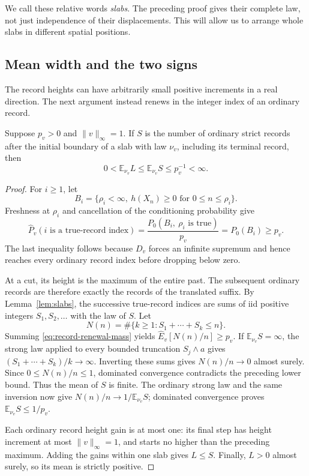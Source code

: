 We call these relative words \emph{slabs}.  The preceding proof gives
their complete law, not just independence of their displacements.  This
will allow us to arrange whole slabs in different spatial positions.

\subsection{Mean width and the two signs}

The record heights can have arbitrarily small positive increments in a
real direction.  The next argument instead renews in the integer index
of an ordinary record.

\begin{lemma}\label{lem:mean-width}
Suppose $p_v>0$ and $\|v\|_\infty=1$.  If $S$ is the number of ordinary
strict records after the initial boundary of a slab with law $\nu_v$,
including its terminal record, then
\[
 0<\mathbb E_{\nu_v}L\le\mathbb E_{\nu_v}S\le p_v^{-1}<\infty.
\]
\end{lemma}

\begin{proof}
For $i\ge1$, let
\[
 B_i=\{\rho_i<\infty,\ h(X_n)\ge0\text{ for }0\le n\le\rho_i\}.
\]
Freshness at $\rho_i$ and cancellation of the conditioning probability
give
\begin{equation}\label{eq:record-renewal-mass}
 \widehat P_v(i\text{ is a true-record index})
   =\frac{P_0(B_i,\ \rho_i\text{ is true})}{p_v}
   =P_0(B_i)\ge p_v.
\end{equation}
The last inequality follows because $D_v$ forces an infinite supremum
and hence reaches every ordinary record index before dropping below zero.

At a cut, its height is the maximum of the entire past.  The subsequent
ordinary records are therefore exactly the records of the translated
suffix.  By Lemma~\ref{lem:slabs}, the successive true-record indices are
sums of iid positive integers $S_1,S_2,\ldots$ with the law of $S$.  Let
\[
 N(n)=\#\{k\ge1:S_1+\cdots+S_k\le n\}.
\]
Summing \eqref{eq:record-renewal-mass} yields
$\widehat E_v[N(n)/n]\ge p_v$.
If $\mathbb E_{\nu_v}S=\infty$, the strong law applied to every bounded
truncation $S_j\wedge a$ gives
$(S_1+\cdots+S_k)/k\to\infty$.  Inverting these sums gives
$N(n)/n\to0$ almost surely.  Since $0\le N(n)/n\le1$, dominated
convergence contradicts the preceding lower bound.  Thus the mean of
$S$ is finite.  The ordinary strong law and the same inversion now give
$N(n)/n\to1/\mathbb E_{\nu_v}S$; dominated convergence proves
$\mathbb E_{\nu_v}S\le1/p_v$.

Each ordinary record height gain is at most one: its final step has
height increment at most $\|v\|_\infty=1$, and starts no higher than the
preceding maximum.  Adding the gains within one slab gives $L\le S$.
Finally, $L>0$ almost surely, so its mean is strictly positive.
\end{proof}

